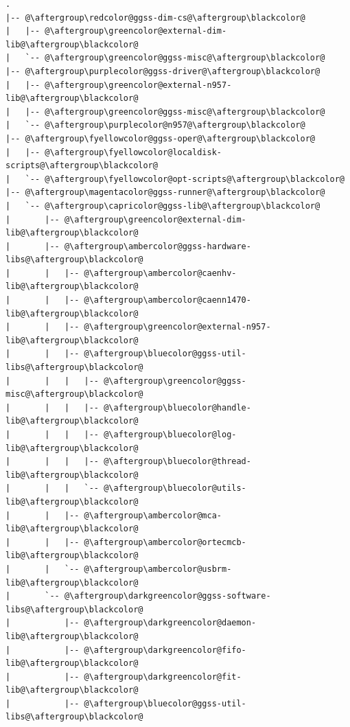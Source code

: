 \begin{multicols*}{2}[]
\begin{lstlisting}[language=Cmd, title={(a) Aktualna struktura katalogów}, escapechar=@, label={lst:compareStructure}]
.
|-- @\aftergroup\redcolor@ggss-dim-cs@\aftergroup\blackcolor@
|   |-- @\aftergroup\greencolor@external-dim-lib@\aftergroup\blackcolor@
|   `-- @\aftergroup\greencolor@ggss-misc@\aftergroup\blackcolor@
|-- @\aftergroup\purplecolor@ggss-driver@\aftergroup\blackcolor@
|   |-- @\aftergroup\greencolor@external-n957-lib@\aftergroup\blackcolor@
|   |-- @\aftergroup\greencolor@ggss-misc@\aftergroup\blackcolor@
|   `-- @\aftergroup\purplecolor@n957@\aftergroup\blackcolor@
|-- @\aftergroup\fyellowcolor@ggss-oper@\aftergroup\blackcolor@
|   |-- @\aftergroup\fyellowcolor@localdisk-scripts@\aftergroup\blackcolor@
|   `-- @\aftergroup\fyellowcolor@opt-scripts@\aftergroup\blackcolor@
|-- @\aftergroup\magentacolor@ggss-runner@\aftergroup\blackcolor@
|   `-- @\aftergroup\capricolor@ggss-lib@\aftergroup\blackcolor@
|       |-- @\aftergroup\greencolor@external-dim-lib@\aftergroup\blackcolor@
|       |-- @\aftergroup\ambercolor@ggss-hardware-libs@\aftergroup\blackcolor@
|       |   |-- @\aftergroup\ambercolor@caenhv-lib@\aftergroup\blackcolor@
|       |   |-- @\aftergroup\ambercolor@caenn1470-lib@\aftergroup\blackcolor@
|       |   |-- @\aftergroup\greencolor@external-n957-lib@\aftergroup\blackcolor@
|       |   |-- @\aftergroup\bluecolor@ggss-util-libs@\aftergroup\blackcolor@
|       |   |   |-- @\aftergroup\greencolor@ggss-misc@\aftergroup\blackcolor@
|       |   |   |-- @\aftergroup\bluecolor@handle-lib@\aftergroup\blackcolor@
|       |   |   |-- @\aftergroup\bluecolor@log-lib@\aftergroup\blackcolor@
|       |   |   |-- @\aftergroup\bluecolor@thread-lib@\aftergroup\blackcolor@
|       |   |   `-- @\aftergroup\bluecolor@utils-lib@\aftergroup\blackcolor@
|       |   |-- @\aftergroup\ambercolor@mca-lib@\aftergroup\blackcolor@
|       |   |-- @\aftergroup\ambercolor@ortecmcb-lib@\aftergroup\blackcolor@
|       |   `-- @\aftergroup\ambercolor@usbrm-lib@\aftergroup\blackcolor@
|       `-- @\aftergroup\darkgreencolor@ggss-software-libs@\aftergroup\blackcolor@
|           |-- @\aftergroup\darkgreencolor@daemon-lib@\aftergroup\blackcolor@
|           |-- @\aftergroup\darkgreencolor@fifo-lib@\aftergroup\blackcolor@
|           |-- @\aftergroup\darkgreencolor@fit-lib@\aftergroup\blackcolor@
|           |-- @\aftergroup\bluecolor@ggss-util-libs@\aftergroup\blackcolor@

\end{lstlisting}
\end{multicols*}
